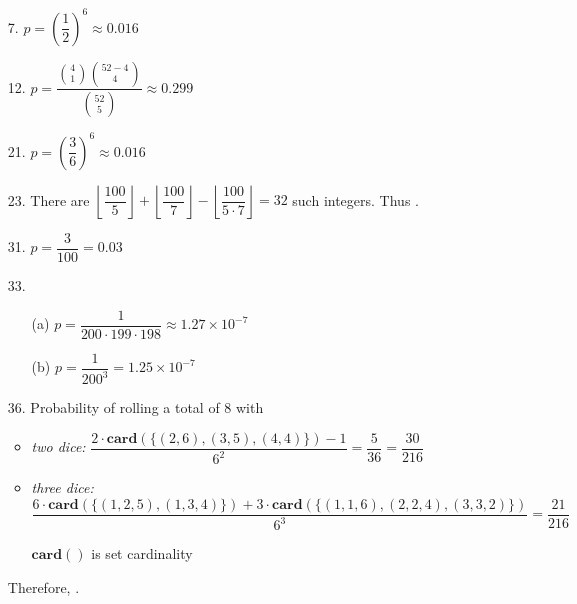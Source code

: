 \documentclass{article}
\begin{document}
\begin{enumerate}
    \item[7.] $p = \left( \dfrac{1}{2} \right)^6 \approx 0.016$
    \item[12.] $p = \dfrac{\binom{4}{1} \binom{52-4}{4}}{\binom{52}{5}} \approx 0.299$
    \item[21.] $p = \left( \dfrac{3}{6} \right)^6 \approx 0.016$
    \item[23.] There are $\left\lfloor\dfrac{100}{5}\right\rfloor + \left\lfloor\dfrac{100}{7}\right\rfloor - \left\lfloor\dfrac{100}{5\cdot 7}\right\rfloor = 32$ such integers. Thus .
    \item[31.] $p = \dfrac{3}{100} = 0.03$
    \item[33.]
        \begin{itemize}
            \item[(a)] $p = \dfrac{1}{200 \cdot 199 \cdot 198} \approx 1.27 \times 10^{-7}$
            \item[(b)] $p = \dfrac{1}{200^3} = 1.25 \times 10^{-7}$
        \end{itemize}
    \item[36.] Probability of rolling a total of 8 with
        \begin{itemize}
            \item \textit{two dice:} $\dfrac{ 2 \cdot \mathbf{card}(\{ (2,6), (3,5), (4,4) \}) - 1}{6^2} = \dfrac{5}{36} = \dfrac{30}{216}$
            \item \textit{three dice:} $\dfrac{6 \cdot \mathbf{card}( \{ (1,2,5), (1,3,4) \} ) + 3 \cdot \mathbf{card}( \{ (1,1,6), (2,2,4), (3,3,2) \} )}{6^3} = \dfrac{21}{216}$
            \begin{flushright}
            \small{$\mathbf{card}()$ is set cardinality}
            \end{flushright}
        \end{itemize}

    Therefore, .
\end{enumerate}
\end{document}
